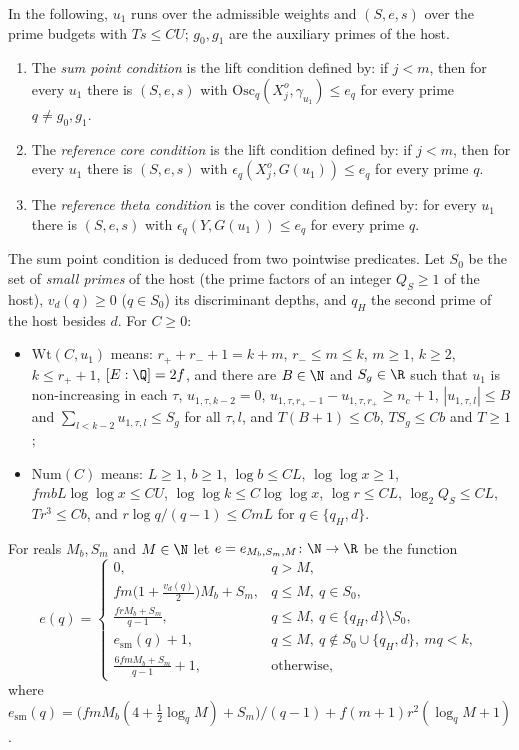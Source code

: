 \begin{definition}\label{pf:lift1:refconds}
In the following, $u_1$ runs over the admissible weights and $(S,e,s)$ over the prime budgets with
$Ts\le CU$; $g_0,g_1$ are the auxiliary primes of the host.
\begin{enumerate}[label=(\alph*)]
\item The \emph{sum point condition} is the lift condition defined by: if $j<m$, then for every $u_1$
  there is $(S,e,s)$ with $\mathrm{Osc}_q(X^o_j,\gamma_{u_1})\le e_q$ for every prime $q\ne g_0,g_1$.
\item The \emph{reference core condition} is the lift condition defined by: if $j<m$, then for every
  $u_1$ there is $(S,e,s)$ with $\epsilon_q(X^o_j,G(u_1))\le e_q$ for every prime $q$.
\item The \emph{reference theta condition} is the cover condition defined by: for every $u_1$ there is
  $(S,e,s)$ with $\epsilon_q(Y,G(u_1))\le e_q$ for every prime $q$.
\end{enumerate}
\end{definition}

The sum point condition is deduced from two pointwise predicates. Let $S_0$ be the set of \emph{small
primes} of the host (the prime factors of an integer $Q_S\ge1$ of the host), $v_d(q)\ge0$ ($q\in S_0$)
its discriminant depths, and $q_H$ the second prime of the host besides $d$. For $C\ge0$:
\begin{itemize}
\item $\mathrm{Wt}(C,u_1)$ means: $r_++r_-+1=k+m$, $r_-\le m\le k$, $m\ge1$, $k\ge2$, $k\le r_++1$,
  $[E:\Q]=2f$, and there are $B\in\N$ and $S_g\in\R$ such that $u_1$ is non-increasing in each $\tau$,
  $u_{1,\tau,k-2}=0$, $u_{1,\tau,r_+-1}-u_{1,\tau,r_+}\ge n_c+1$, $|u_{1,\tau,l}|\le B$ and
  $\sum_{l<k-2}u_{1,\tau,l}\le S_g$ for all $\tau,l$, and $T(B+1)\le Cb$, $TS_g\le Cb$ and $T\ge1$;
\item $\mathrm{Num}(C)$ means: $L\ge1$, $b\ge1$, $\log b\le CL$, $\log\log x\ge1$,
  $fmbL\log\log x\le CU$, $\log\log k\le C\log\log x$, $\log r\le CL$, $\log_2Q_S\le CL$, $Tr^3\le Cb$, and
  $r\log q/(q-1)\le CmL$ for $q\in\{q_H,d\}$.
\end{itemize}
For reals $M_b,S_m$ and $M\in\N$ let $e=e_{M_b,S_m,M}\colon\N\to\R$ be the function
\begin{equation}\label{pf:lift1:eq:eof}
e(q)=\begin{cases}
0,&q>M,\\
fm\bigl(1+\tfrac{v_d(q)}2\bigr)M_b+S_m,&q\le M,\ q\in S_0,\\
\frac{frM_b+S_m}{q-1},&q\le M,\ q\in\{q_H,d\}\setminus S_0,\\
e_{\mathrm{sm}}(q)+1,&q\le M,\ q\notin S_0\cup\{q_H,d\},\ mq<k,\\
\frac{6fmM_b+S_m}{q-1}+1,&\text{otherwise},
\end{cases}
\end{equation}
where $e_{\mathrm{sm}}(q)=\bigl(fmM_b(4+\frac12\log_qM)+S_m\bigr)/(q-1)+f(m+1)r^2(\log_qM+1)$.

